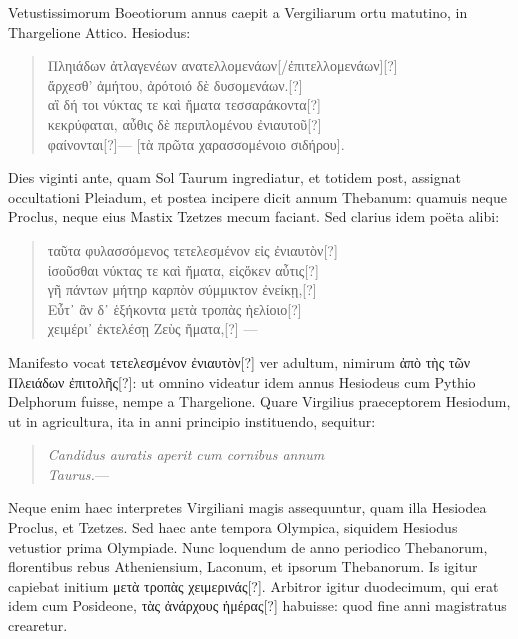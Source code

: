 Vetustissimorum Boeotiorum annus caepit a Vergiliarum
ortu matutino, in Thargelione Attico.
Hesiodus:
\begin{verse}
\textgreek{Πληιάδων ἀτλαγενέων ανατελλομενάων[/ἐπιτελλομενάων][?]}\\
\textgreek{ἄρχεσθ’ ἀμήτου, ἀρότοιό δὲ δυσομενάων.[?]}\\
\textgreek{αἳ δή τοι νύκτας τε καὶ ἤματα τεσσαράκοντα[?]}\\
\textgreek{κεκρύφαται, αὖθις δὲ περιπλομένου ἐνιαυτοῦ[?]}\\
\textgreek{φαίνονται[?]}--- \textgreek{[τὰ πρῶτα χαρασσομένοιο σιδήρου]}.
\end{verse}
Dies viginti ante, quam Sol Taurum ingrediatur, et totidem post,
assignat occultationi Pleiadum, et postea incipere dicit annum Thebanum:
quamuis neque Proclus, neque eius Mastix Tzetzes mecum
faciant.
Sed clarius idem poëta alibi:
\begin{verse}
\textgreek{ταῦτα φυλασσόμενος τετελεσμένον εἰς ἐνιαυτὸν[?]}\\
\textgreek{ἰσοῦσθαι νύκτας τε καὶ ἤματα, εἰςὅκεν αὖτις[?]}\\
\textgreek{γῆ πάντων μήτηρ καρπὸν σύμμικτον ἐνείκῃ,[?]}\\
\textgreek{Εὖτ᾽ ἂν δ᾽ ἑξήκοντα μετὰ τροπὰς ἠελίοιο[?]}\\
\textgreek{χειμέρι᾽ ἐκτελέσῃ Ζεὺς ἤματα,[?]} ---
\end{verse}
Manifesto vocat \textgreek{τετελεσμένον ἐνιαυτὸν[?]} ver adultum,
 nimirum \textgreek{ἀπὸ τὴς τῶν Πλειάδων ἐπιτολῆς[?]}:
ut omnino videatur idem annus Hesiodeus cum
Pythio Delphorum fuisse, nempe a Thargelione.
Quare Virgilius
praeceptorem Hesiodum, ut in agricultura, ita in anni principio
instituendo, sequitur:
\begin{verse}
  \emph{Candidus auratis aperit cum cornibus annum}\\
  \emph{Taurus.}---
\end{verse}
Neque enim haec interpretes Virgiliani magis assequuntur, quam illa
Hesiodea Proclus, et Tzetzes.
Sed haec ante tempora Olympica, siquidem
Hesiodus vetustior prima Olympiade.
Nunc loquendum de
anno periodico Thebanorum, florentibus rebus Atheniensium, Laconum,
et ipsorum Thebanorum.
Is igitur capiebat initium \textgreek{μετὰ τροπὰς
χειμερινάς[?]}.
Arbitror igitur duodecimum, qui erat idem cum Posideone,
\textgreek{τὰς ἀνάρχους ἡμέρας[?]} habuisse: quod fine anni magistratus
crearetur.

